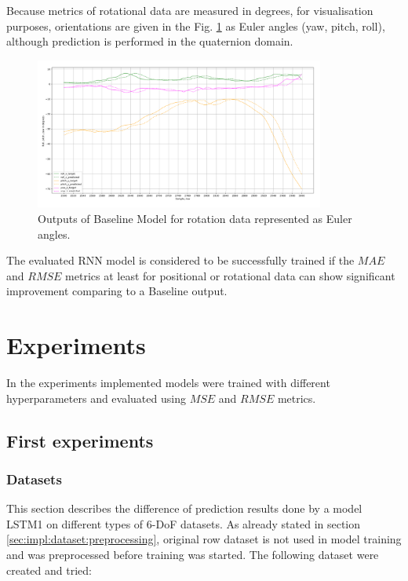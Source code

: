 Because metrics of rotational data are measured in degrees, for visualisation purposes, orientations are given in the Fig. \ref{fig:base_euler} as Euler angles (yaw, pitch, roll), although prediction is performed in the quaternion domain.

\begin{figure}[htb]
	\begin{center}
		\includegraphics[width=0.85\textwidth, keepaspectratio]{gfx/base_euler-roll_pitch_yaw.png}
		\caption{\label{fig:base_euler} Outputs of Baseline Model for rotation data represented as Euler angles.}
	\end{center}
\end{figure}

The evaluated RNN model is considered to be successfully trained if the $MAE$ and $RMSE$ metrics at least for positional or rotational data can show significant improvement comparing to a Baseline output. 

\newpage
\section{Experiments}
\label{sec:eval:experiments}
In the experiments implemented models were trained with different hyperparameters and evaluated using $MSE$ and $RMSE$ metrics. 

\subsection{First experiments}
\label{sec:eval:experiments:early}

\subsubsection{Datasets}
\label{sec:eval:experiments:early:ds}
This section describes the difference of prediction results done by a model LSTM1 on different types of 6-DoF datasets. As already stated in section \ref{sec:impl:dataset:preprocessing}, original row dataset is not used in model training and was preprocessed before training was started. The following dataset were created and tried:

